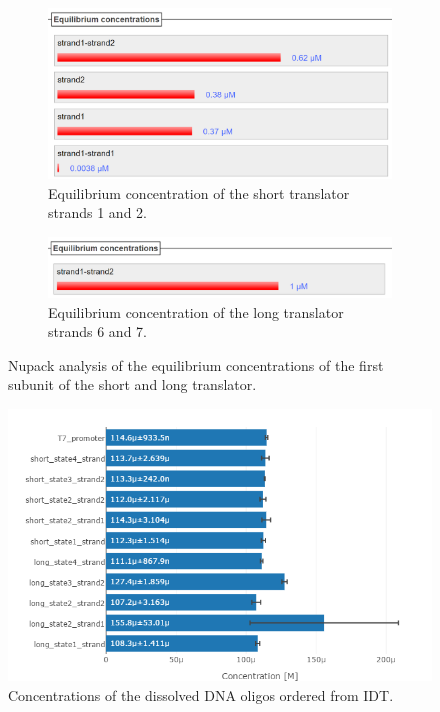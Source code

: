 \begin{figure}
\begin{subfigure}[b]{.49\columnwidth}
  \centering
  \includegraphics[width=\linewidth]{images/short_annealing_concentration.png}
  \caption{Equilibrium concentration of the short translator strands 1 and 2.}
\end{subfigure}
\hfill
\begin{subfigure}[b]{.49\columnwidth}
  \centering
  \includegraphics[width=\linewidth]{images/long_annealing_concentration.png}
  \caption{Equilibrium concentration of the long translator strands 6 and 7.}
\end{subfigure}
\caption{Nupack analysis of the equilibrium concentrations of the first subunit of the short and long translator.}
\label{annealing_concentration}
\end{figure}

\begin{figure}
\centering
\includegraphics[width=\columnwidth]{images/oligo_concentrations.png}
\caption{Concentrations of the dissolved DNA oligos ordered from IDT.}
\label{oligo_concentrations}
\end{figure}

